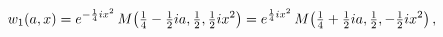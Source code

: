 \[w_{1}(a,x)=e^{-\frac{1}{4}ix^{2}}\mathop{M\/}\nolimits\!\left(\tfrac{1}{4}-%
\tfrac{1}{2}ia,\tfrac{1}{2},\tfrac{1}{2}ix^{2}\right)=e^{\frac{1}{4}ix^{2}}%
\mathop{M\/}\nolimits\!\left(\tfrac{1}{4}+\tfrac{1}{2}ia,\tfrac{1}{2},-\tfrac{%
1}{2}ix^{2}\right),\]